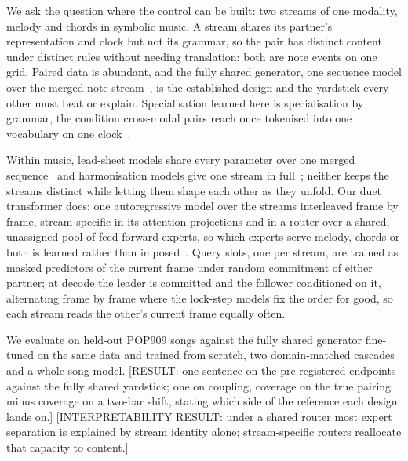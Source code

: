 We ask the question where the control can be built: two streams of
one modality, melody and chords in symbolic music. A stream shares its
partner's representation and clock but not its grammar, so the pair
has distinct content under distinct rules without needing translation:
both are note events on one grid. Paired data is abundant, and the
fully shared generator, one sequence model over the merged note
stream~\cite{cp_transformer,compose_embellish,whole_song}, is the
established design and the yardstick every other must beat or explain.
Specialisation learned here is specialisation by grammar, the
condition cross-modal pairs reach once tokenised into one vocabulary
on one clock~\cite{moshi,audiopalm}.

Within music, lead-sheet models share every parameter over one merged
sequence~\cite{compose_embellish,mmm,whole_song} and harmonisation
models give one stream in full~\cite{yeh2021,sun2021,surprisenet};
neither keeps the
streams distinct while letting them shape each other as they unfold.
Our duet transformer does: one autoregressive model over the streams
interleaved frame by frame, stream-specific in its attention
projections and in a router over a shared, unassigned pool of
feed-forward experts, so which experts serve melody, chords or both is
learned rather than imposed~\cite{moma}. Query slots, one per stream,
are trained as masked predictors of the current frame under random
commitment of either partner; at decode the leader is committed and
the follower conditioned on it, alternating frame by frame where the
lock-step models fix the order for good, so each stream reads the
other's current frame equally often.

We evaluate on held-out POP909 songs against the fully shared
generator fine-tuned on the same data and trained from scratch, two
domain-matched cascades and a whole-song model. [RESULT: one sentence
on the pre-registered endpoints against the fully shared yardstick;
one on coupling, coverage on the true pairing minus coverage on a
two-bar shift, stating which side of the reference each design lands
on.] [INTERPRETABILITY RESULT: under a shared router most expert
separation is explained by stream identity alone; stream-specific
routers reallocate that capacity to content.]
